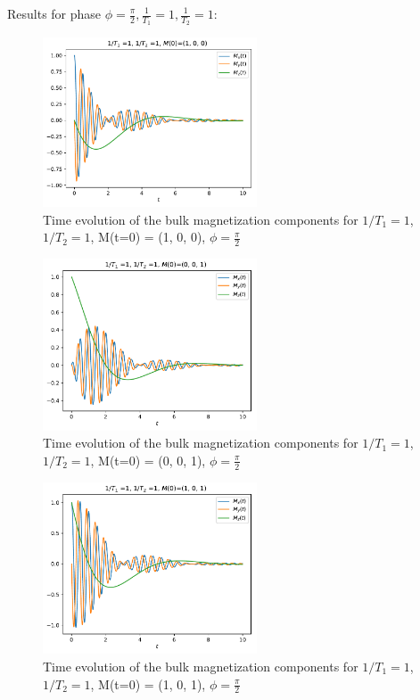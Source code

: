 \documentclass[journal]{IEEEtran} %
\begin{document}
Results for phase $\phi = \frac{\pi}{2}, \frac{1}{T_1} = 1, \frac{1}{T_2} = 1$:
\begin{figure}[H]
\centering
\includegraphics[width=2.5in]{figs/NMR_T1-1_T2-1_Minit-100_tau_0.01_t_10_phase_pi_2.pdf}
\caption{Time evolution of the bulk magnetization components for $1/T_1 = 1$, $1/T_2 = 1$, M(t=0) = (1, 0, 0), $\phi = \frac{\pi}{2}$}
\label{f13}
\end{figure}
\begin{figure}[H]
\centering
\includegraphics[width=2.5in]{figs/NMR_T1-1_T2-1_Minit-001_tau_0.01_t_10_phase_pi_2.pdf}
\caption{Time evolution of the bulk magnetization components for $1/T_1 = 1$, $1/T_2 = 1$, M(t=0) = (0, 0, 1), $\phi = \frac{\pi}{2}$}
\label{f14}
\end{figure}
\begin{figure}[H]
\centering
\includegraphics[width=2.5in]{figs/NMR_T1-1_T2-1_Minit-101_tau_0.01_t_10_phase_pi_2.pdf}
\caption{Time evolution of the bulk magnetization components for $1/T_1 = 1$, $1/T_2 = 1$, M(t=0) = (1, 0, 1), $\phi = \frac{\pi}{2}$}
\label{f15}
\end{figure}
\newpage
\end{document}
